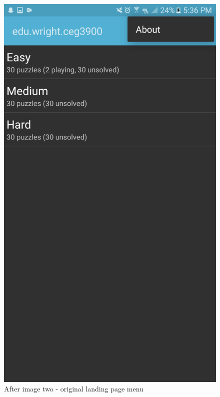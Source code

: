 \documentclass[10pt]{article}
\begin{document}
\begin{figure}
\includegraphics[width=\linewidth]{img/after2.png}
\caption{After image two - original landing page menu}
\end{figure}
\end{document}
